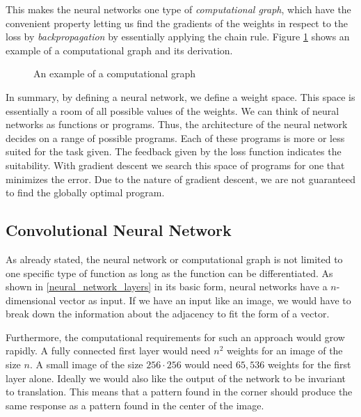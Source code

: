 This makes the neural networks one type of \textit{computational graph}, which have the convenient property letting us find the gradients of the weights in respect to the loss by \textit{backpropagation} by essentially applying the chain rule. Figure \ref{computational_graph} shows an example of a computational graph and its derivation.

\begin{figure}[!h]
    \centering
    \caption{An example of a computational graph}
    \label{computational_graph}
\end{figure}

In summary, by defining a neural network, we define a weight space. This space is essentially a room of all possible values of the weights. We can think of neural networks as functions or programs. Thus, the architecture of the neural network decides on a range of possible programs. Each of these programs is more or less suited for the task given. The feedback given by the loss function indicates the suitability. With gradient descent we search this space of programs for one that minimizes the error. Due to the nature of gradient descent, we are not guaranteed to find the globally optimal program.

\subsection{Convolutional Neural Network}
As already stated, the neural network or computational graph is not limited to one specific type of function as long as the function can be differentiated. As shown in \ref{neural_network_layers} in its basic form, neural networks have a $n$-dimensional vector as input. If we have an input like an image, we would have to break down the information about the adjacency to fit the form of a vector.

Furthermore, the computational requirements for such an approach would grow rapidly. A fully connected first layer would need $n^2$ weights for an image of the size $n$. A small image of the size $ 256 \cdot 256$ would need $65,536$ weights for the first layer alone. Ideally we would also like the output of the network to be invariant to translation. This means that a pattern found in the corner should produce the same response as a pattern found in the center of the image.


